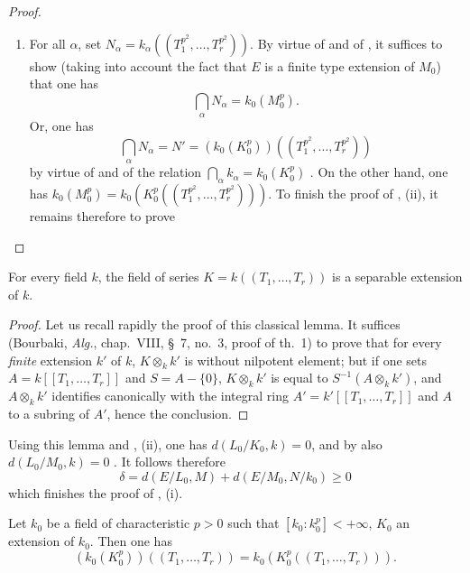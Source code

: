\begin{proof}
\begin{enumerate}
  \item[(ii)] For all $\alpha$, set $N_\alpha=k_\alpha((T_1^{p^2},\ldots,T_r^{p^2}))$.
  By virtue of  and of , it suffices to show (taking into account the fact that $E$ is a finite type extension of $M_0$) that one has
  \[
    \bigcap_\alpha N_\alpha=k_0(M_0^p).
  \]
  Or, one has
  \begin{equation}
  \tag{21.9.6.6}
  \label{0.21.9.6.6}
    \bigcap_\alpha N_\alpha=N'=(k_0(K_0^p))((T_1^{p^2},\ldots,T_r^{p^2}))
  \end{equation}
  by virtue of  and of the relation $\bigcap_\alpha k_\alpha=k_0(K_0^p)$ .
  On the other hand, one has $k_0(M_0^p)=k_0(K_0^p((T_1^{p^2},\ldots,T_r^{p^2})))$.
  To finish the proof of , (ii), it remains therefore to prove
\end{enumerate}
\end{proof}

\begin{lemma}[21.9.6.4]
\label{0.21.9.6.4}
For every field $k$, the field of series $K=k((T_1,\ldots,T_r))$ is a separable extension of $k$.
\end{lemma}

\begin{proof}
Let us recall rapidly the proof of this classical lemma.
It suffices (Bourbaki, \emph{Alg.}, chap.~VIII, \S~7, no.~3, proof of th.~1) to prove that for every \emph{finite} extension $k'$ of $k$, $K\otimes_k k'$ is without nilpotent element; but if one sets $A=k[[T_1,\ldots,T_r]]$ and $S=A-\{0\}$, $K\otimes_k k'$ is equal to $S^{-1}(A\otimes_k k')$, and $A\otimes_k k'$ identifies canonically with the integral ring $A'=k'[[T_1,\ldots,T_r]]$ and $A$ to a subring of $A'$, hence the conclusion.
\end{proof}

Using this lemma and , (ii), one has $d(L_0/K_0,k)=0$, and by 
also $d(L_0/M_0,k)=0$ .
It follows therefore
\[
  \delta=d(E/L_0,M)+d(E/M_0,N/k_0)\geqslant 0
\]
which finishes the proof of , (i).

\begin{lemma}[21.9.6.7]
\label{0.21.9.6.7}
Let $k_0$ be a field of characteristic $p>0$ such that $[k_0:k_0^p]<+\infty$, $K_0$ an extension of $k_0$.
Then one has
\begin{equation}
\tag{21.9.6.8}
  \label{0.21.9.6.8}
  (k_0(K_0^p))((T_1,\ldots,T_r))=k_0(K_0^p((T_1,\ldots,T_r))).
\end{equation}
\end{lemma}

